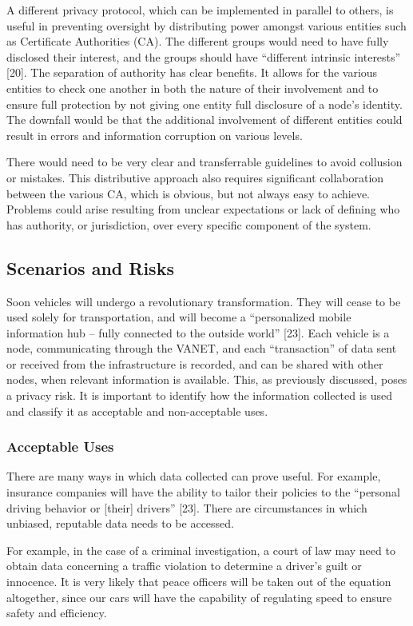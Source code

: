 \documentclass[conference,compsoc]{IEEEtran}
\begin{document}
A different privacy protocol, which can be implemented in parallel to others, is useful in preventing oversight by distributing power amongst various entities such as Certificate Authorities (CA). The different groups would need to have fully disclosed their interest, and the groups should have “different intrinsic interests” [20]. 
The separation of authority has clear benefits. It allows for the various entities to check one another in both the nature of their involvement and to ensure full protection by not giving one entity full disclosure of a node’s identity. The downfall would be that the additional involvement of different entities could result in errors and information corruption on various levels. 

There would need to be very clear and transferrable guidelines to avoid collusion or mistakes. This distributive approach also requires significant collaboration between the various CA, which is obvious, but not always easy to achieve. Problems could arise resulting from unclear expectations or lack of defining who has authority, or jurisdiction, over every specific component of the system.


\subsection{Scenarios and Risks}
Soon vehicles will undergo a revolutionary transformation. They will cease to be used solely for transportation, and will become a “personalized mobile information hub – fully connected to the outside world” [23]. Each vehicle is a node, communicating through the VANET, and each “transaction” of data sent or received from the infrastructure is recorded, and can be shared with other nodes, when relevant information is available. This, as previously discussed, poses a privacy risk. It is important to identify how the information collected is used and classify it as acceptable and non-acceptable uses.

\subsubsection{Acceptable Uses}
There are many ways in which data collected can prove useful. For example, insurance companies will have the ability to tailor their policies to the “personal driving behavior or [their] drivers” [23]. There are circumstances in which unbiased, reputable data needs to be accessed. 

For example, in the case of a criminal investigation, a court of law may need to obtain data concerning a traffic violation to determine a driver’s guilt or innocence. It is very likely that peace officers will be taken out of the equation altogether, since our cars will have the capability of regulating speed to ensure safety and efficiency.
\end{document}

